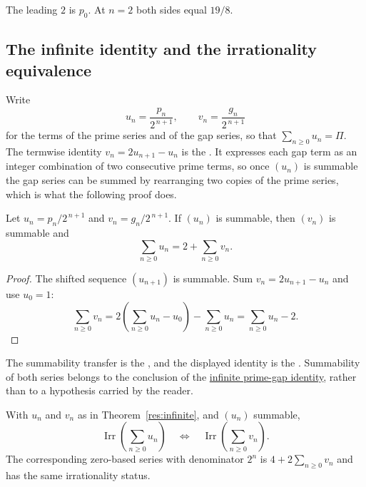 \documentclass[11pt]{article}
\begin{document}
The leading $2$ is $p_0$.  At $n=2$ both sides equal $19/8$.

\subsection{The infinite identity and the irrationality equivalence}\label{sec:infinite}

Write
\[
 u_n=\frac{p_n}{2^{\,n+1}},\qquad
 v_n=\frac{g_n}{2^{\,n+1}}
\]
for the terms of the prime series and of the gap series, so that
$\sum_{n\ge0}u_n=\Pi$.  The termwise identity $v_n=2u_{n+1}-u_n$ is the
.  It expresses each gap term as an integer combination of
two consecutive prime terms, so once $(u_n)$ is summable the gap series can be
summed by rearranging two copies of the prime series, which is what the
following proof does.

\begin{theorem}\label{res:infinite}
Let $u_n=p_n/2^{\,n+1}$ and $v_n=g_n/2^{\,n+1}$.  If $(u_n)$ is summable, then
$(v_n)$ is summable and
\[
 \sum_{n\ge0}u_n=2+\sum_{n\ge0}v_n .
\]
\end{theorem}

\begin{proof}
The shifted sequence $(u_{n+1})$ is summable.  Sum
$v_n=2u_{n+1}-u_n$ and use $u_0=1$:
\[
 \sum_{n\ge0}v_n
 =2\left(\sum_{n\ge0}u_n-u_0\right)-\sum_{n\ge0}u_n
 =\sum_{n\ge0}u_n-2 .
\]
\end{proof}

\noindent The summability transfer is the
, and the displayed identity is the
.  Summability of both series belongs to the conclusion of the
\href{https://github.com/wcook04/plectis-erdos/blob/f36a98bf3d3e6f65f1074e3b800e3293d5b8a51a/ErdosProblems/Erdos251/PaperCoreR7.lean#L47}{infinite prime-gap identity}, rather than to a hypothesis carried by the
reader.

\begin{corollary}\label{res:irr-equivalence}
With $u_n$ and $v_n$ as in Theorem~\ref{res:infinite}, and $(u_n)$ summable,
\[
 \operatorname{Irr}\!\left(\sum_{n\ge0}u_n\right)
 \quad\Longleftrightarrow\quad
 \operatorname{Irr}\!\left(\sum_{n\ge0}v_n\right).
\]
The corresponding zero-based series with denominator $2^n$ is
$4+2\sum_{n\ge0}v_n$ and has the same irrationality status.
\end{corollary}
\end{document}
